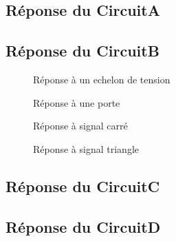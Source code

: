 \documentclass[a4paper,11pt]{article}
\begin{document}
  \subsection{Réponse du CircuitA}
  \subsection{Réponse du CircuitB}
 
      \begin{figure}[H]
	 \begin{center}
	\caption{Réponse à un echelon de tension}
	\end{center}
      \end{figure}
      
      \begin{figure}[H]
	      \begin{center}
		\caption{Réponse à une porte}
	      \end{center}
	    \end{figure}

      \begin{figure}[H]
	      \begin{center}
		\caption{Réponse à signal carré}
	      \end{center}
	    \end{figure}

      \begin{figure}[H]
	      \begin{center}
		\caption{Réponse à signal triangle}
	      \end{center}
	    \end{figure}
    
  \subsection{Réponse du CircuitC}
  \subsection{Réponse du CircuitD}
\end{document}
